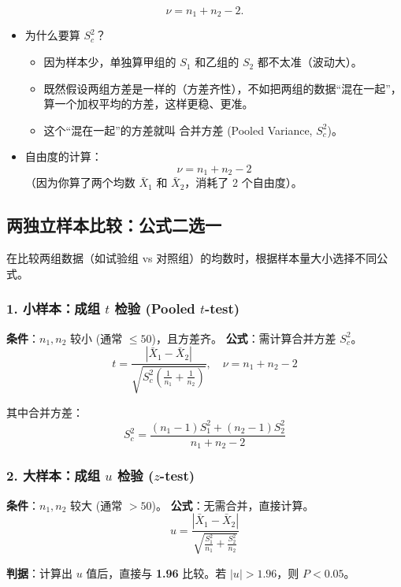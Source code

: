 \documentclass[lang=cn,10pt]{elegantbook}
\begin{document}
\[
  \nu=n_1+n_2-2.
\]

\begin{itemize}
    \item 为什么要算 $S_c^2$？
    \begin{itemize}
        \item 因为样本少，单独算甲组的 $S_1$ 和乙组的 $S_2$ 都不太准（波动大）。
        \item 既然假设两组方差是一样的（方差齐性），不如把两组的数据“混在一起”，算一个加权平均的方差，这样更稳、更准。
        \item 这个“混在一起”的方差就叫 合并方差 (Pooled Variance, $S_c^2$)。
    \end{itemize}
    \item 自由度的计算：
    $$\nu = n_1 + n_2 - 2$$
    （因为你算了两个均数 $\bar{X}_1$ 和 $\bar{X}_2$，消耗了 2 个自由度）。
\end{itemize}


\subsection{两独立样本比较：公式二选一}

在比较两组数据（如试验组 vs 对照组）的均数时，根据样本量大小选择不同公式。

\subsubsection{1. 小样本：成组 $t$ 检验 (Pooled $t$-test)}
\textbf{条件}：$n_1, n_2$ 较小 (通常 $\le 50$)，且方差齐。
\textbf{公式}：需计算合并方差 $S_c^2$。
\begin{equation}
    t = \frac{|\bar{X}_1 - \bar{X}_2|}{\sqrt{S_c^2 \left(\frac{1}{n_1} + \frac{1}{n_2}\right)}}, \quad \nu = n_1 + n_2 - 2
\end{equation}

其中合并方差：
\[ S_c^2 = \frac{(n_1-1)S_1^2 + (n_2-1)S_2^2}{n_1 + n_2 - 2} \]

\subsubsection{2. 大样本：成组 $u$ 检验 ($z$-test)}
\textbf{条件}：$n_1, n_2$ 较大 (通常 $> 50$)。
\textbf{公式}：无需合并，直接计算。
\begin{equation}
    u = \frac{|\bar{X}_1 - \bar{X}_2|}{\sqrt{\frac{S_1^2}{n_1} + \frac{S_2^2}{n_2}}}
\end{equation}

\textbf{判据}：计算出 $u$ 值后，直接与 \textbf{1.96} 比较。若 $|u| > 1.96$，则 $P < 0.05$。
\end{document}
